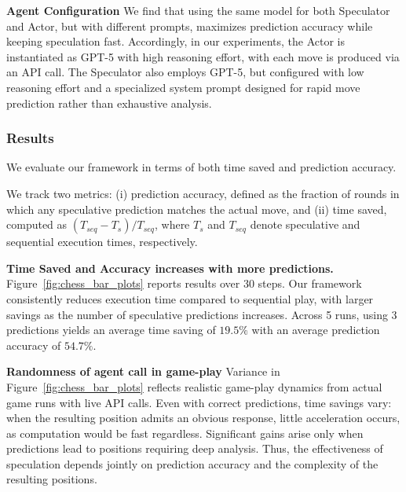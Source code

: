 \textbf{Agent Configuration} We find that using the same model for both Speculator and Actor, but with different prompts, maximizes prediction accuracy while keeping speculation fast. Accordingly, in our experiments, the Actor is instantiated as GPT-5 with high reasoning effort, with each move is produced via an API call. The Speculator also employs GPT-5, but configured with low reasoning effort and a specialized system prompt designed for rapid move prediction rather than exhaustive analysis.


\subsubsection{Results}
We evaluate our framework in terms of both time saved and prediction accuracy.

We track two metrics: (i) prediction accuracy, defined as the fraction of rounds in which any speculative prediction matches the actual move, and (ii) time saved, computed as $(T_{seq}-T_{s})/T_{seq}$, where $T_{s}$ and $T_{seq}$ denote speculative and sequential execution times, respectively.


\textbf{Time Saved and Accuracy increases with more predictions.}
Figure~\ref{fig:chess_bar_plots} reports results over 30 steps. Our framework consistently reduces execution time compared to sequential play, with larger savings as the number of speculative predictions increases. Across 5 runs, using 3 predictions yields an average time saving of $19.5\%$ with an average prediction accuracy of $54.7\%$.

\textbf{Randomness of agent call in game-play}
Variance in Figure~\ref{fig:chess_bar_plots} reflects realistic game-play dynamics from actual game runs with live API calls. Even with correct predictions, time savings vary: when the resulting position admits an obvious response, little acceleration occurs, as computation would be fast regardless. Significant gains arise only when predictions lead to positions requiring deep analysis. Thus, the effectiveness of speculation depends jointly on prediction accuracy and the complexity of the resulting positions.